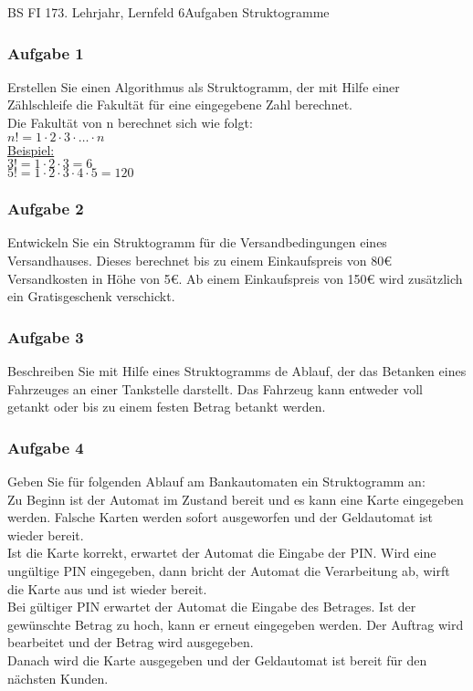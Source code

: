 \documentclass[oneside,openany,headings=optiontotoc,11pt,numbers=noenddot,Nassi]{scrreprt}
\begin{document}
	\begin{worksheet}{BS FI 17}{3. Lehrjahr, Lernfeld 6}{Aufgaben Struktogramme}
		\begin{framed}
			\subsubsection*{Aufgabe 1}
			Erstellen Sie einen Algorithmus als Struktogramm, der mit Hilfe einer Zählschleife die Fakultät für eine eingegebene Zahl berechnet.\\
			Die Fakultät von n berechnet sich wie folgt:\\
			\(n! = 1 \cdot 2 \cdot 3 \cdot \ldots \cdot n\)\\
			\underline{Beispiel:}\\
			\(3! = 1\cdot2\cdot3 = 6\)\\
			\(5! = 1\cdot2\cdot3\cdot4\cdot5 = 120\)
			\subsubsection*{Aufgabe 2}
			Entwickeln Sie ein Struktogramm für die Versandbedingungen eines Versandhauses. Dieses berechnet bis zu einem Einkaufspreis von 80\euro{} Versandkosten in Höhe von 5\euro{}. Ab einem Einkaufspreis von 150\euro{} wird zusätzlich ein Gratisgeschenk verschickt.
			\subsubsection*{Aufgabe 3}
			Beschreiben Sie mit Hilfe eines Struktogramms de Ablauf, der das Betanken eines Fahrzeuges an einer Tankstelle darstellt. Das Fahrzeug kann entweder voll getankt oder bis zu einem festen Betrag betankt werden.
			\subsubsection*{Aufgabe 4}
			Geben Sie für folgenden Ablauf am Bankautomaten ein Struktogramm an:\\
			Zu Beginn ist der Automat im Zustand \grqq{}bereit\grqq{} und es kann eine Karte eingegeben werden. Falsche Karten werden sofort ausgeworfen und der Geldautomat ist wieder bereit.\\
			Ist die Karte korrekt, erwartet der Automat die Eingabe der PIN. Wird eine ungültige PIN eingegeben, dann bricht der Automat die Verarbeitung ab, wirft die Karte aus und ist wieder bereit.\\
			Bei gültiger PIN erwartet der Automat die Eingabe des Betrages. Ist der gewünschte Betrag zu hoch, kann er erneut eingegeben werden. Der Auftrag wird bearbeitet und der Betrag wird ausgegeben.\\
			Danach wird die Karte ausgegeben und der Geldautomat ist bereit für den nächsten Kunden.

\end{framed}
\end{worksheet}
\end{document}
